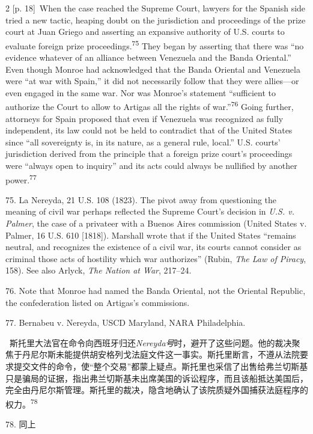 \documentclass[10pt,a4paper]{article}
\begin{document}
\begin{paracol}{2}
{\scriptsize\color{gray} [p. 18]}\ When the case reached the Supreme Court, lawyers for the Spanish side tried a new tactic, heaping doubt on the jurisdiction and proceedings of the prize court at Juan Griego and asserting an expansive authority of U.S. courts to evaluate foreign prize proceedings.\nobreak\textsuperscript{75} They began by asserting that there was “no evidence whatever of an alliance between Venezuela and the Banda Oriental.” Even though Monroe had acknowledged that the Banda Oriental and Venezuela were “at war with Spain,” it did not necessarily follow that they were allies—or even engaged in the same war. Nor was Monroe’s statement “sufficient to authorize the Court to allow to Artigas all the rights of war.”\nobreak\textsuperscript{76} Going further, attorneys for Spain proposed that even if Venezuela was recognized as fully independent, its law could not be held to contradict that of the United States since “all sovereignty is, in its nature, as a general rule, local.” U.S. courts’ jurisdiction derived from the principle that a foreign prize court’s proceedings were “always open to inquiry” and its acts could always be nullified by another power.\nobreak\textsuperscript{77}\par{\small 75. La Nereyda, 21 U.S. 108 (1823). The pivot away from questioning the meaning of civil war perhaps reflected the Supreme Court’s decision in \textit{U.S. v. Palmer}, the case of a privateer with a Buenos Aires commission (United States v. Palmer, 16 U.S. 610 [1818]). Marshall wrote that if the United States “remains neutral, and recognizes the existence of a civil war, its courts cannot consider as criminal those acts of hostility which war authorizes” (Rubin, \textit{The Law of Piracy}, 158). See also Arlyck, \textit{The Nation at War}, 217–24.\par}{\small 76. Note that Monroe had named the Banda Oriental, not the Oriental Republic, the confederation listed on Artigas’s commissions.\par}{\small 77. Bernabeu v. Nereyda, USCD Maryland, NARA Philadelphia.\par}
\switchcolumn*
{\scriptsize\color{gray} [p. 19]}\ 斯托里大法官在命令向西班牙归还\textit{Nereyda号}时，避开了这些问题。他的裁决聚焦于丹尼尔斯未能提供胡安格列戈法庭文件这一事实。斯托里断言，不遵从法院要求提交文件的命令，使“整个交易”都蒙上疑点。斯托里也采信了出售给弗兰切斯基只是骗局的证据，指出弗兰切斯基未出席美国的诉讼程序，而且该船抵达美国后，完全由丹尼尔斯管理。斯托里的裁决，隐含地确认了该院质疑外国捕获法庭程序的权\mbox{力。\textsuperscript{78}}\par{\small 78. 同上\par}

\end{paracol}
\end{document}
